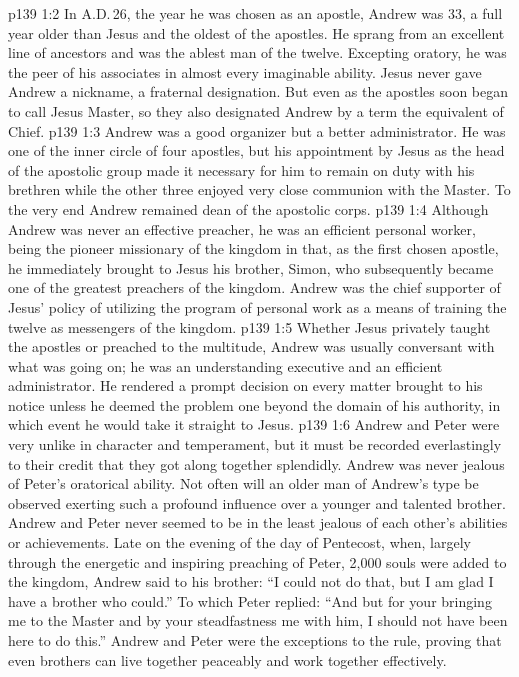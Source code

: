 \vs p139 1:2 In A.D.\,26, the year he was chosen as an apostle, Andrew was 33, a full year older than Jesus and the oldest of the apostles. He sprang from an excellent line of ancestors and was the ablest man of the twelve. Excepting oratory, he was the peer of his associates in almost every imaginable ability. Jesus never gave Andrew a nickname, a fraternal designation. But even as the apostles soon began to call Jesus Master, so they also designated Andrew by a term the equivalent of Chief.
\vs p139 1:3 \pc Andrew was a good organizer but a better administrator. He was one of the inner circle of four apostles, but his appointment by Jesus as the head of the apostolic group made it necessary for him to remain on duty with his brethren while the other three enjoyed very close communion with the Master. To the very end Andrew remained dean of the apostolic corps.
\vs p139 1:4 Although Andrew was never an effective preacher, he was an efficient personal worker, being the pioneer missionary of the kingdom in that, as the first chosen apostle, he immediately brought to Jesus his brother, Simon, who subsequently became one of the greatest preachers of the kingdom. Andrew was the chief supporter of Jesus’ policy of utilizing the program of personal work as a means of training the twelve as messengers of the kingdom.
\vs p139 1:5 Whether Jesus privately taught the apostles or preached to the multitude, Andrew was usually conversant with what was going on; he was an understanding executive and an efficient administrator. He rendered a prompt decision on every matter brought to his notice unless he deemed the problem one beyond the domain of his authority, in which event he would take it straight to Jesus.
\vs p139 1:6 \pc Andrew and Peter were very unlike in character and temperament, but it must be recorded everlastingly to their credit that they got along together splendidly. Andrew was never jealous of Peter’s oratorical ability. Not often will an older man of Andrew’s type be observed exerting such a profound influence over a younger and talented brother. Andrew and Peter never seemed to be in the least jealous of each other’s abilities or achievements. Late on the evening of the day of Pentecost, when, largely through the energetic and inspiring preaching of Peter, 2,000 souls were added to the kingdom, Andrew said to his brother: “I could not do that, but I am glad I have a brother who could.” To which Peter replied: “And but for your bringing me to the Master and by your steadfastness  me with him, I should not have been here to do this.” Andrew and Peter were the exceptions to the rule, proving that even brothers can live together peaceably and work together effectively.
